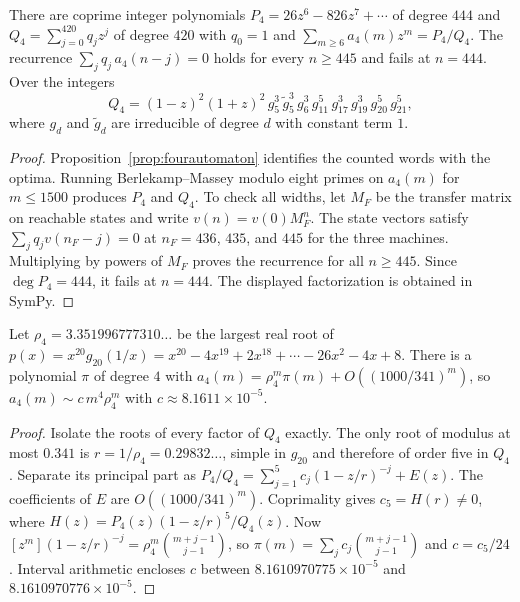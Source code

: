 \begin{theorem}\label{thm:fourgfexact}
There are coprime integer polynomials $P_4=26z^6-826z^7+\cdots$ of degree $444$ and $Q_4=\sum_{j=0}^{420}q_jz^j$ of degree $420$ with $q_0=1$ and $\sum_{m\ge6}a_4(m)z^m=P_4/Q_4$. The recurrence $\sum_jq_j\,a_4(n-j)=0$ holds for every $n\ge445$ and fails at $n=444$. Over the integers
\[
Q_4=(1-z)^2(1+z)^2\,g_5^3\,\tilde g_5^3\,g_6^3\,g_{11}^5\,g_{17}^3\,g_{19}^3\,g_{20}^5\,g_{21}^5,
\]
where $g_d$ and $\tilde g_d$ are irreducible of degree $d$ with constant term $1$.
\end{theorem}

\begin{proof}
Proposition~\ref{prop:fourautomaton} identifies the counted words with the optima. Running Berlekamp--Massey modulo eight primes on $a_4(m)$ for
$m\le1500$ produces $P_4$ and $Q_4$.
To check all widths, let $M_F$ be the transfer
matrix on reachable states and write $v(n)=v(0)M_F^n$.
The state vectors satisfy $\sum_jq_jv(n_F-j)=0$ at
$n_F=436$, $435$, and $445$ for the three machines.
Multiplying by powers of $M_F$ proves the recurrence for all $n\ge445$. Since $\deg P_4=444$, it fails at $n=444$.
The displayed factorization is obtained in SymPy.
\end{proof}

\begin{corollary}\label{cor:fourgrowth}
Let $\rho_4=3.351996777310\ldots$ be the largest real root of $p(x)=x^{20}g_{20}(1/x)=x^{20}-4x^{19}+2x^{18}+\cdots-26x^2-4x+8$. There is a polynomial $\pi$ of degree $4$ with $a_4(m)=\rho_4^m \pi(m)+O((1000/341)^m)$, so $a_4(m)\sim c\,m^4\rho_4^m$ with $c\approx8.1611\times10^{-5}$.
\end{corollary}

\begin{proof}
Isolate the roots of every factor of $Q_4$ exactly. The only root
of modulus at most $0.341$ is $r=1/\rho_4=0.29832\ldots$,
simple in $g_{20}$ and therefore of order five in $Q_4$.
Separate its principal part as
$P_4/Q_4=\sum_{j=1}^{5}c_j(1-z/r)^{-j}+E(z)$.
The coefficients of $E$ are $O((1000/341)^m)$.
Coprimality gives $c_5=H(r)\ne0$, where
$H(z)=P_4(z)(1-z/r)^5/Q_4(z)$.
Now $[z^m](1-z/r)^{-j}=\rho_4^m\binom{m+j-1}{j-1}$, so
$\pi(m)=\sum_jc_j\binom{m+j-1}{j-1}$ and $c=c_5/24$.
Interval arithmetic encloses $c$ between
$8.1610970775\times10^{-5}$ and $8.1610970776\times10^{-5}$.
\end{proof}
